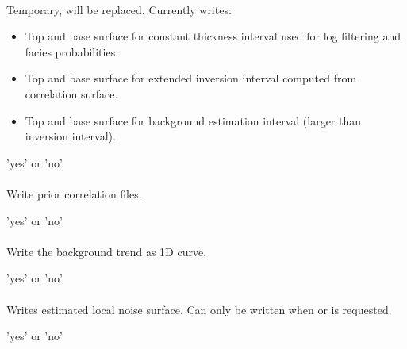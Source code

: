 \paragraph{}
 \slist
   \item \Description Temporary, will be replaced. Currently writes:
   \begin{itemize}
   \item Top and base surface for constant thickness interval used for log filtering and facies probabilities.
   \item Top and base surface for extended inversion interval computed from correlation surface.
   \item Top and base surface for background estimation interval (larger than inversion interval).
   \end{itemize}
   \item \Argument 'yes' or 'no'
   \item \Default
 \elist

\paragraph{}
 \slist
   \item \Description Write prior correlation files.
   \item \Argument 'yes' or 'no'
   \item \Default
 \elist

\paragraph{}
 \slist
   \item \Description Write the background trend as 1D curve.
   \item \Argument 'yes' or 'no'
   \item \Default
 \elist

\paragraph{}
 \slist
   \item \Description Writes estimated local noise surface. Can only be written when  or  is requested.
   \item \Argument 'yes' or 'no'
   \item \Default
 \elist

